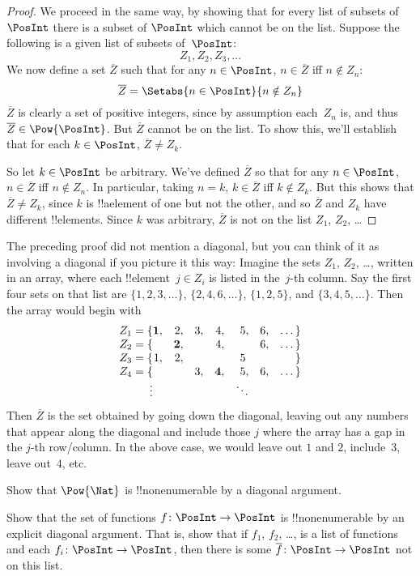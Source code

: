 \documentclass[../../../include/open-logic-section]{subfiles}
\begin{document}
\begin{proof}
We proceed in the same way, by showing that for every list of subsets
of~$\PosInt$ there is a subset of $\PosInt$ which cannot be on the list.
Suppose the following is a given list of subsets of~$\PosInt$:
\[
Z_{1}, Z_{2}, Z_{3}, \dots
\]
We now define a set $\overline{Z}$ such that for any $n \in \PosInt$,
$n \in \overline{Z}$ iff $n \notin Z_{n}$:
\[
\overline{Z} = \Setabs{n \in \PosInt}{n \notin Z_n}
\]
$\overline{Z}$ is clearly a set of positive integers, since by
assumption each~$Z_n$ is, and thus $\overline{Z} \in
\Pow{\PosInt}$. But $\overline{Z}$ cannot be on the list.  To show
this, we'll establish that for each $k \in \PosInt$, $\overline{Z} \neq
Z_k$. 

So let $k \in \PosInt$ be arbitrary. We've defined $\overline{Z}$ so
that for any $n \in \PosInt$, $n \in \overline{Z}$ iff $n \notin Z_n$.
In particular, taking $n=k$, $k \in \overline{Z}$ iff $k \notin Z_k$.
But this shows that $\overline{Z} \neq Z_k$, since $k$ is !!a{element}
of one but not the other, and so $\overline{Z}$ and $Z_k$ have
different !!{element}s. Since $k$ was arbitrary, $\overline{Z}$ is not
on the list $Z_1$, $Z_2$, \dots
\end{proof}

\begin{explain}
The preceding proof did not mention a diagonal, but you can think of
it as involving a diagonal if you picture it this way: Imagine the
sets $Z_1$, $Z_2$, \dots, written in an array, where each
!!{element}~$j \in Z_i$ is listed in the~$j$-th column. Say the first
four sets on that list are $\{1,2,3,\dots\}$, $\{2, 4, 6, \dots\}$,
$\{1,2,5\}$, and $\{3,4,5,\dots\}$. Then the array would begin with
\[
\begin{array}{r@{}rrrrrrr}
  Z_1 = \{ & \mathbf{1}, & 2, & 3, & 4, & 5, & 6, & \dots\}\\
  Z_2 = \{ &  & \mathbf{2}, &  & 4, &  & 6, & \dots\}\\
  Z_3 = \{ & 1, & 2, &  &  & 5\phantom{,} &  & \}\\
  Z_4 = \{ &  &  & 3, & \mathbf{4}, & 5, & 6, & \dots\}\\
  \vdots & & & & & \ddots
\end{array}
\]
Then $\overline{Z}$ is the set obtained by going down the diagonal,
leaving out any numbers that appear along the diagonal and include
those $j$ where the array has a gap in the $j$-th row/column. In the
above case, we would leave out $1$ and $2$, include~$3$, leave
out~$4$, etc.
\end{explain}

\begin{prob}
Show that $\Pow{\Nat}$ is !!{nonenumerable} by a diagonal argument.
\end{prob}

\begin{prob}\label{sfr:siz:nen:prob:f-posint}
Show that the set of functions $f \colon \PosInt \to \PosInt$ is
!!{nonenumerable} by an explicit diagonal argument. That is, show that
if $f_1$, $f_2$, \dots, is a list of functions and each $f_i\colon
\PosInt \to \PosInt$, then there is some $\overline{f}\colon \PosInt \to
\PosInt$ not on this list.
\end{prob}
\end{document}
